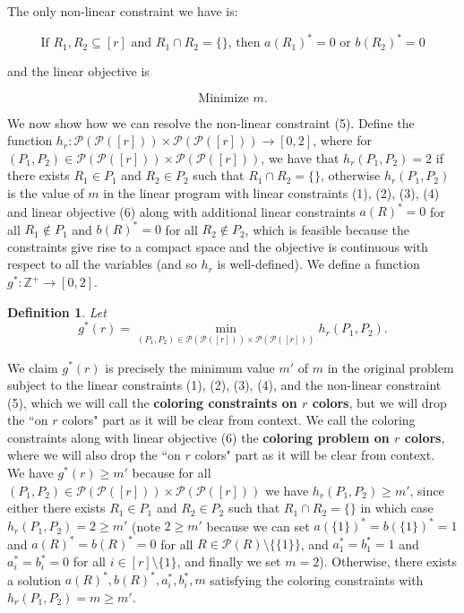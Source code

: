 \documentclass{article}
\newtheorem{definition}{Definition}
\begin{document}
\noindent
The only non-linear constraint we have is:

\begin{equation}
\text{If $R_1,R_2 \subseteq [r]$ and $R_1 \cap R_2 = \{\}$, then $a(R_1)^* = 0$ or $b(R_2)^* = 0$}
\end{equation}

\noindent
and the linear objective is 

\begin{equation}
\text{Minimize $m$.}
\end{equation}

We now show how we can resolve the non-linear constraint (5). Define the function $h_r : \mathcal{P}(\mathcal{P}([r])) \times \mathcal{P}(\mathcal{P}([r])) \rightarrow [0,2]$, where for $(P_1,P_2) \in  \mathcal{P}(\mathcal{P}([r])) \times \mathcal{P}(\mathcal{P}([r]))$, we have that $h_r(P_1,P_2) = 2$ if there exists $R_1 \in P_1$ and $R_2 \in P_2$ such that $R_1 \cap R_2 = \{\}$, otherwise $h_r(P_1,P_2)$ is the value of $m$ in the linear program with linear constraints (1), (2), (3), (4) and linear objective (6) along with additional linear constraints $a(R)^* = 0$ for all $R_1 \not \in P_1$ and $b(R)^* = 0$ for all $R_2 \not \in P_2$, which is feasible because the constraints give rise to a compact space and the objective is continuous with respect to all the variables (and so $h_r$ is well-defined). We define a function $g^* : \mathbb{Z}^{+} \rightarrow [0,2]$.

\begin{definition}
Let $$g^*(r) = \min_{(P_1,P_2) \in  \mathcal{P}(\mathcal{P}([r])) \times \mathcal{P}(\mathcal{P}([r]))} h_r(P_1,P_2).$$  
\end{definition}

We claim $g^*(r)$ is precisely the minimum value $m'$ of $m$ in the original problem subject to the linear constraints (1), (2), (3), (4), and the non-linear constraint (5), which we will call the \textbf{coloring constraints on $r$ colors}, but we will drop the ``on $r$ colors" part as it will be clear from context. We call the coloring constraints along with linear objective (6) the \textbf{coloring problem on $r$ colors}, where we will also drop the ``on $r$ colors" part as it will be clear from context.\\

We have $g^*(r) \geq m'$ because for all $(P_1,P_2) \in  \mathcal{P}(\mathcal{P}([r])) \times \mathcal{P}(\mathcal{P}([r]))$ we have $h_r(P_1,P_2) \geq m'$, since either there exists $R_1 \in P_1$ and $R_2 \in P_2$ such that $R_1 \cap R_2 = \{\}$ in which case $h_r(P_1,P_2) = 2 \geq m'$ (note $2 \geq m'$ because we can set $a(\{1\})^* = b(\{1\})^* = 1$ and $a(R)^* = b(R)^* = 0$ for all $R \in \mathcal{P}(R) \setminus \{\{1\}\}$, and $a_1^* = b_1^* = 1$ and $a_i^* = b_i^* = 0$ for all $i \in [r] \setminus \{1\}$, and finally we set $m = 2$). Otherwise, there exists a solution $a(R)^*, b(R)^*, a_i^*, b_i^*, m$ satisfying the coloring constraints with $h_r(P_1,P_2) = m \geq m'$. \\
\end{document}
